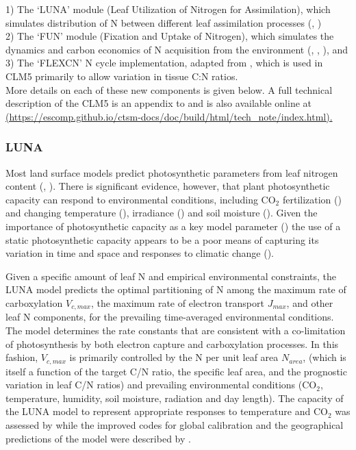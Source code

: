 \documentclass[draft,linenumbers]{agujournal}
\begin{document}
1) The `LUNA' module (Leaf Utilization of Nitrogen for Assimilation), which simulates distribution of N between different leaf assimilation processes (\cite{xu2012}, \cite{ali2016}) \\

2) The `FUN' module (Fixation and Uptake of Nitrogen), which simulates the dynamics and carbon economics of N acquisition from the environment (\cite{fisher2010fun}, \cite{brzostek2014}, \cite{shi2016}), and\\

3) The `FLEXCN' N cycle implementation, adapted from \cite{ghimire2016}, which is used in CLM5 primarily to allow variation in tissue C:N ratios.\\

More details on each of these new components is given below. A full technical description of the CLM5 is an appendix to \cite{lawrence2018} and is also available online at \url{(https://escomp.github.io/ctsm-docs/doc/build/html/tech_note/index.html).}

\subsubsection{LUNA}
Most land surface models predict photosynthetic parameters from leaf nitrogen content (\cite{kattge2009}, \cite{bonan2012}). There is significant evidence, however, that plant photosynthetic capacity can respond to environmental conditions, including CO$_{2}$ fertilization (\cite{ainsworth2007}) and changing temperature (\cite{hikosaka2005}), irradiance (\cite{niinemets1998}) and soil moisture (\cite{keenan2009}). Given the importance of photosynthetic capacity as a key model parameter (\cite{rogers2017}) the use of a static photosynthetic capacity appears to be a poor means of capturing its variation in time and space and responses to climatic change (\cite{walker2017}).

Given a specific amount of leaf N and empirical environmental constraints, the LUNA model predicts the optimal partitioning of N among the maximum rate of carboxylation $V_{c,max}$, the maximum rate of electron transport $J_{max}$, and other leaf N components, for the prevailing time-averaged environmental conditions. The model determines the rate constants that are consistent with a co-limitation of photosynthesis by both electron capture and carboxylation processes. In this fashion, $V_{c,max}$ is primarily controlled by the N per unit leaf area $N_{area}$, (which is itself a function of the target C/N ratio, the specific leaf area, and the prognostic variation in leaf C/N ratios) and prevailing environmental conditions (CO$_{2}$, temperature, humidity, soil moisture, radiation and day length). The capacity of the LUNA model to represent appropriate responses to temperature and CO$_{2}$ was assessed by \cite{xu2012} while the improved codes for global calibration and the geographical predictions of the model were described by \cite{ali2016}. 
\end{document}

